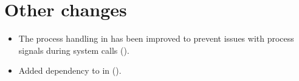 \section{Other changes}
\begin{itemize}
\item The process handling in  has been improved to prevent issues with process
  signals during system calls ().
\item Added dependency to  in  ().
\end{itemize}
